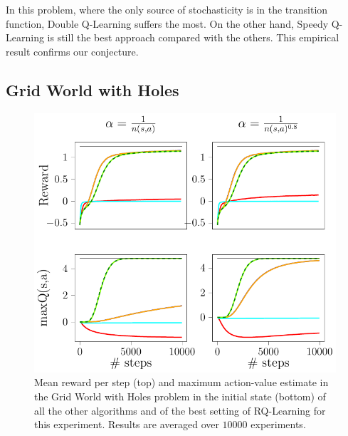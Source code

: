 In this problem, where the only source of stochasticity is in the transition function, Double Q-Learning suffers the most. On the other hand, Speedy Q-Learning is still the best approach compared with the others. This empirical result confirms our conjecture.
\subsection{Grid World with Holes}
\begin{figure}[t]
\begin{minipage}{\columnwidth}
\centering
  \includegraphics[scale=.7]{./img/grid_hole.pdf}
\end{minipage}
  \caption[Grid world with holes algorithms comparison - 1]{Mean reward per step (top) and maximum action-value estimate in the Grid World with Holes problem in the initial state (bottom) of all the other algorithms and of the best setting of RQ-Learning for this experiment. Results are averaged over $10000$ experiments.}
  \label{F:hole}
\end{figure}

